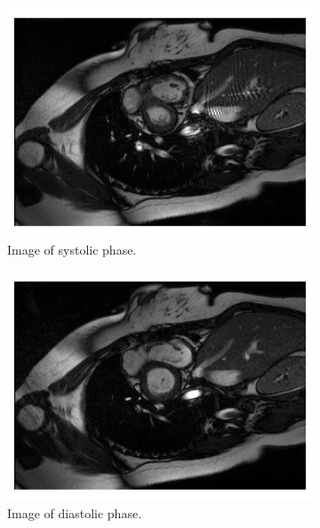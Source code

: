 \begin{figure}[h]%
	\centering
	\begin{subfigure}{0.49\textwidth}
    		\includegraphics[width=\textwidth]{./Images/Image_ACDC_systolic.png}
    		\caption{Image of systolic phase.}
    		\label{fig:Image_ACDC_systolic}
	\end{subfigure}
	\hfill
	\begin{subfigure}{0.49\textwidth}
    		\includegraphics[width=\textwidth]{./Images/Image_ACDC_diastolic.png}
    		\caption{Image of diastolic phase.}
    		\label{fig:Image_ACDC_diastolic}
	\end{subfigure} 
	\\
	\begin{subfigure}{0.49\textwidth}

\end{subfigure}
\end{figure}
